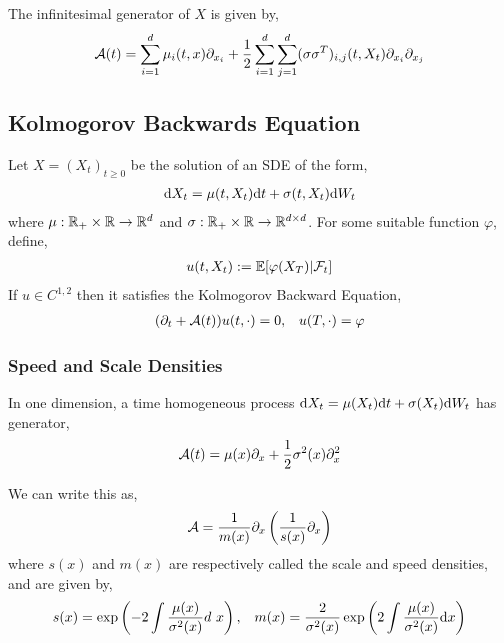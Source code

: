 \documentclass[12pt]{article}
\begin{document}
The infinitesimal generator of \( X \) is given by,
\begin{align*}
    \mathcal{A}(t) = \sum_{i=1}^{d}\mu_i(t,x)\partial_{x_i} + \frac{1}{2} \sum_{i=1}^{d}\sum_{j=1}^{d} (\sigma\sigma^T)_{i,j}(t,X_t)\partial_{x_i} \partial_{x_j}
\end{align*}

\iffalse
In the 2d case,
\begin{align*}
    \sigma \sigma^T = \left[\begin{array}{cc} 
        \sigma_{1,1}^2+\sigma_{1,2}^2 & \sigma_{1,1}\sigma_{2,1} + \sigma_{1,2}\sigma_{2,2} \\
        \sigma_{1,1}\sigma_{2,1}+\sigma_{1,2}\sigma_{2,2} & \sigma_{2,1}^2 + \sigma_{2,2}^2
    \end{array}\right]
\end{align*}
\fi


\subsection{Kolmogorov Backwards Equation}
Let \( X = (X_t)_{t\geq 0} \) be the solution of an SDE of the form,
\begin{align*}
    \mathrm{d} X_t = \mu(t,X_t)\mathrm{d} t + \sigma(t,X_t)\mathrm{d} W_t
\end{align*}
where \( \mu:\mathbb{R}_+\times\mathbb{R} \to\mathbb{R}^d  \) and \( \sigma:\mathbb{R}_+\times\mathbb{R} \to \mathbb{R}^{d\times d} \).
For some suitable function \( \varphi \), define,
\begin{align*}
    u(t,X_t):= \mathbb{E}[\varphi(X_T)|\mathcal{F}_t]
\end{align*}
If \( u\in C^{1,2} \) then it satisfies the Kolmogorov Backward Equation,
\begin{align*}
    (\partial_t + \cA(t)) u(t,\cdot) = 0, && u(T,\cdot) = \varphi %
\end{align*}

\subsubsection{Speed and Scale Densities}
In one dimension, a time homogeneous process \( \mathrm{d} X_t = \mu(X_t) \mathrm{d} t + \sigma(X_t) \mathrm{d} W_t \) has generator,
\begin{align*}
    \mathcal{A}(t) = \mu(x) \partial_x + \frac{1}{2}\sigma^2(x)\partial_x^2
\end{align*}

We can write this as,
\begin{align*}
    \mathcal{A} = \frac{1}{m(x)}\partial_x \left( \frac{1}{s(x)}\partial_x \right)
\end{align*}
where \( s(x) \) and \( m(x) \) are respectively called the scale and speed densities, and are given by,
\begin{align*}
    s(x) = \exp \left( - 2\int \frac{\mu(x)}{\sigma^2(x)}d\ x \right)
    ,&& m(x) = \frac{2}{\sigma^2(x)} \exp \left( 2\int \frac{\mu(x)}{\sigma^2(x)}\mathrm{d} x \right)
\end{align*}
\end{document}
